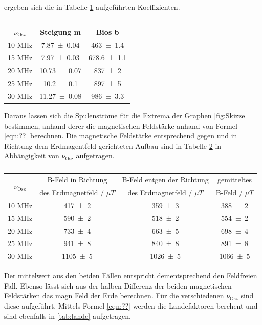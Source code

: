 ergeben sich die in Tabelle \ref{tab:stei} aufgeführten Koeffizienten. 
\begin{table}
  \centering
  \caption{}
  \begin{tabular}{c|c c}
    \toprule
    	$\nu_\text{Osz}$ & Steigung m & Bios b \\
    \midrule
       	10 MHz & \num{7.87 +- 0.04}  & \num{463 +- 1.4} \\
	15 MHz & \num{7.97 +- 0.03}  & \num{678.6 +- 1.1} \\ 
	20 MHz & \num{10.73 +- 0.07} & \num{837 +- 2} \\
	25 MHz & \num{10.2 +- 0.1}   & \num{897 +- 5} \\
	30 MHz & \num{11.27 +- 0.08} & \num{986 +- 3.3}\\
    \bottomrule
  \end{tabular}
  \label{tab:stei}
\end{table}
Daraus lassen sich die Spulenströme für die Extrema der Graphen \ref{fig:Skizze} bestimmen, anhand derer die magnetischen Feldstärke anhand von Formel \ref{eqn:??} berechnen. Die magnetische Feldstärke entsprechend gegen und in Richtung dem Erdmagentfeld gerichteten Aufbau sind in Tabelle \ref{tab:magn} in Abhängigkeit von $\nu_\text{Osz}$ aufgetragen.  
\begin{table}
  \centering
  \caption{}
  \begin{tabular}{c|c c c}
    \toprule
    \multirow{2}{*}{$\nu_\text{Osz}$} & B-Feld in Richtung & B-Feld entgen der Richtung & gemitteltes \\
    	& des Erdmagnetfeld / $\mu T$ & des Erdmagnetfeld / $\mu T$ & B-Feld / $\mu T$ \\
    \midrule
       	10 MHz & \num{417 +- 2} & \num{359 +- 3} & \num{388 +- 2} \\
	15 MHz & \num{590 +- 2} & \num{518 +- 2} & \num{554 +- 2} \\ 
	20 MHz & \num{733 +- 4} & \num{663 +- 5} & \num{698 +- 4} \\
	25 MHz & \num{941 +- 8} & \num{840 +- 8} & \num{891 +- 8} \\
	30 MHz & \num{1105 +- 5} & \num{1026 +- 5} & \num{1066 +- 5} \\
    \bottomrule
  \end{tabular}
  \label{tab:magn}
\end{table}
Der mittelwert aus den beiden Fällen entspricht dementsprechend den Feldfreien Fall. Ebenso lässt sich aus der halben Differenz der beiden magnetischen Feldstärken das magn Feld der Erde berechnen. Für die verschiedenen $\nu_\text{Osz}$ sind diese aufgeführt. Mittels Formel \ref{eqn:??} werden die Landefaktoren berchent und sind ebenfalls in \ref{tab:lande} aufgetragen.
